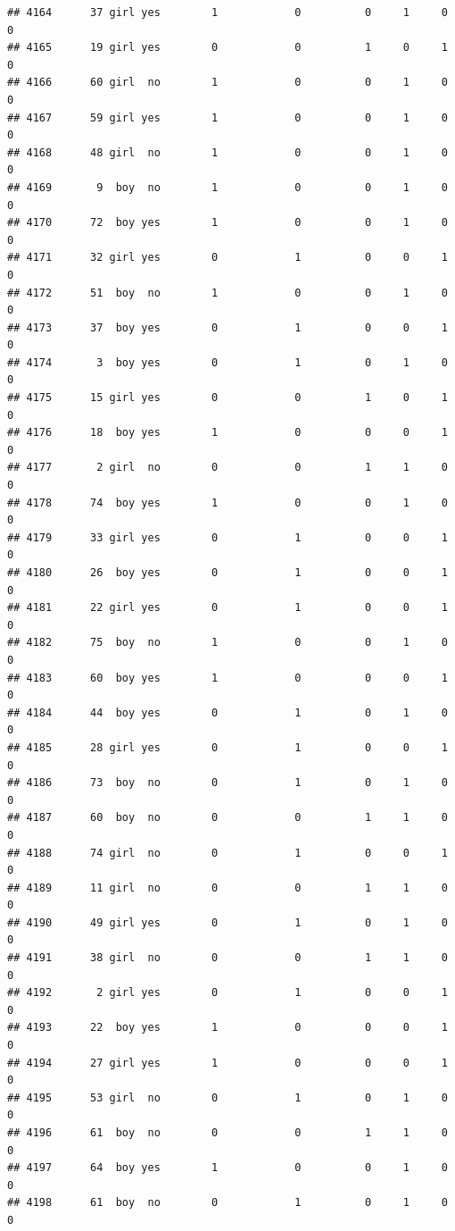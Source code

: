 \documentclass[man]{apa6}
\begin{document}
\begin{verbatim}
## 4164      37 girl yes        1            0          0     1     0     0
## 4165      19 girl yes        0            0          1     0     1     0
## 4166      60 girl  no        1            0          0     1     0     0
## 4167      59 girl yes        1            0          0     1     0     0
## 4168      48 girl  no        1            0          0     1     0     0
## 4169       9  boy  no        1            0          0     1     0     0
## 4170      72  boy yes        1            0          0     1     0     0
## 4171      32 girl yes        0            1          0     0     1     0
## 4172      51  boy  no        1            0          0     1     0     0
## 4173      37  boy yes        0            1          0     0     1     0
## 4174       3  boy yes        0            1          0     1     0     0
## 4175      15 girl yes        0            0          1     0     1     0
## 4176      18  boy yes        1            0          0     0     1     0
## 4177       2 girl  no        0            0          1     1     0     0
## 4178      74  boy yes        1            0          0     1     0     0
## 4179      33 girl yes        0            1          0     0     1     0
## 4180      26  boy yes        0            1          0     0     1     0
## 4181      22 girl yes        0            1          0     0     1     0
## 4182      75  boy  no        1            0          0     1     0     0
## 4183      60  boy yes        1            0          0     0     1     0
## 4184      44  boy yes        0            1          0     1     0     0
## 4185      28 girl yes        0            1          0     0     1     0
## 4186      73  boy  no        0            1          0     1     0     0
## 4187      60  boy  no        0            0          1     1     0     0
## 4188      74 girl  no        0            1          0     0     1     0
## 4189      11 girl  no        0            0          1     1     0     0
## 4190      49 girl yes        0            1          0     1     0     0
## 4191      38 girl  no        0            0          1     1     0     0
## 4192       2 girl yes        0            1          0     0     1     0
## 4193      22  boy yes        1            0          0     0     1     0
## 4194      27 girl yes        1            0          0     0     1     0
## 4195      53 girl  no        0            1          0     1     0     0
## 4196      61  boy  no        0            0          1     1     0     0
## 4197      64  boy yes        1            0          0     1     0     0
## 4198      61  boy  no        0            1          0     1     0     0

\end{verbatim}
\end{document}
